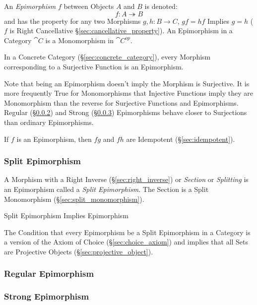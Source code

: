 An \emph{Epimorphism} $f$ between Objects $A$ and $B$ is denoted:
\[
  f : A \twoheadrightarrow B
\]
and has the property for any two Morphisms $g, h : B \rightarrow C$,
$gf = hf$ Implies $g = h$ ($f$ is Right Cancellative
\S\ref{sec:cancellative_property}). An Epimorphism in a Category
$\cat{C}$ is a Monomorphism in $\cat{C^{op}}$.

In a Concrete Category (\S\ref{sec:concrete_category}), every Morphism
corresponding to a Surjective Function is an Epimorphism.

\fist Note that being an Epimorphism doesn't imply the Morphism
is Surjective. It is more frequently True for Monomorphisms that
Injective Functions imply they are Monomorphism than the reverse for
Surjective Functions and Epimorphisms. Regular
(\S\ref{sec:regular_epimorphism}) and Strong
(\S\ref{sec:strong_epimorphism}) Epimorphisms behave closer to
Surjections than ordinary Epimorphisms.

If $f$ is an Epimorphism, then $fg$ and $fh$ are Idempotent
(\S\ref{sec:idempotent}). %



\subsubsection{Split Epimorphism}\label{sec:split_epimorphism}

A Morphism with a Right Inverse (\S\ref{sec:right_inverse}) or
\emph{Section} or \emph{Splitting} is an Epimorphism called a
\emph{Split Epimorphism}. The Section is a Split Monomorphism
(\S\ref{sec:split_monomorphism}).

Split Epimorphism Implies Epimorphism

The Condition that every Epimorphism be a Split Epimorphism in a
Category is a version of the Axiom of Choice
(\S\ref{sec:choice_axiom}) and implies that all Sets are Projective
Objects (\S\ref{sec:projective_object}).\cite{awodey06}



\subsubsection{Regular Epimorphism}\label{sec:regular_epimorphism}

\subsubsection{Strong Epimorphism}\label{sec:strong_epimorphism}

